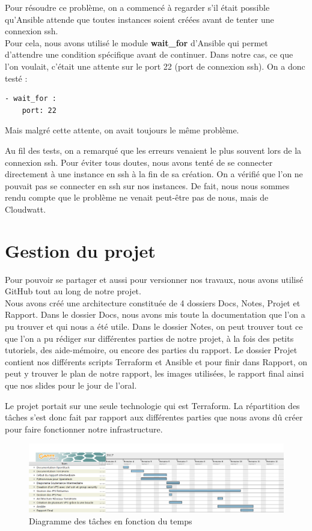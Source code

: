 \documentclass[]{article}
\begin{document}
Pour résoudre ce problème, on a commencé à regarder s'il était possible
qu'Ansible attende que toutes instances soient créées avant de tenter
une connexion ssh.\\
 Pour cela, nous avons utilisé le module
\textbf{wait\_for} d'Ansible qui permet d'attendre une condition
spécifique avant de continuer. Dans notre cas, ce que l'on voulait,
c'était une attente sur le port 22 (port de connexion ssh).
On a donc testé :
\begin{verbatim}
- wait_for :
    port: 22
\end{verbatim}
Mais malgré cette attente, on avait toujours le même problème.

Au fil des tests, on a remarqué que les erreurs venaient le plus souvent
lors de la connexion ssh. Pour éviter tous doutes, nous avons tenté de se
connecter directement à une instance en ssh à  la fin de sa création.
On a vérifié que l'on ne pouvait pas se connecter en
ssh sur nos instances. De fait, nous nous sommes rendu compte que le problème ne
venait peut-être pas de nous, mais de Cloudwatt. 
\newpage
\section{Gestion du projet}\label{ruxe9partition-des-tuxe2ches-au-seins-du-groupe}
Pour pouvoir se partager et aussi pour versionner nos travaux, nous avons utilisé GitHub tout au long de notre projet. \\
Nous avons créé une architecture constituée de 4 dossiers Docs, Notes, Projet et Rapport.
Dans le dossier Docs, nous avons mis toute la documentation que l'on a pu trouver et qui nous a été utile. Dans le dossier Notes, on peut trouver tout ce que l'on a pu rédiger sur différentes parties de notre projet, à la fois des petits tutoriels, des aide-mémoire, ou encore des parties du rapport. Le dossier Projet contient nos différents scripts Terraform et Ansible et pour finir dans Rapport, on peut y trouver le plan de notre rapport, les images utilisées, le rapport final ainsi que nos slides pour le jour de l'oral.

Le projet portait sur une seule technologie qui est Terraform. La
répartition des tâches s'est donc fait par rapport aux différentes
parties que nous avons dû créer pour faire fonctionner notre
infrastructure.
\begin{figure}
\centering
\includegraphics{Images/TerraFormGant.png}
\caption{Diagramme des tâches en fonction du temps}
\end{figure}
\newpage
\end{document}
